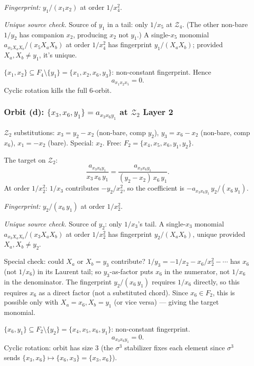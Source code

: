 \documentclass[11pt]{article}
\newcommand{\Z}{\mathcal{Z}}
\theoremstyle{definition}
\begin{document}
\emph{Fingerprint:} $y_1/(x_1 x_2)$ at order $1/x_4^2$.

\emph{Unique source check.} Source of $y_1$ in a tail: only $1/x_5$ at
$\Z_4$. (The other non-bare $1/y_2$ has companion $x_2$, producing $x_2$ not
$y_1$.) A single-$x_5$ monomial $a_{x_5 X_a X_b}/(x_5 X_a X_b)$ at order
$1/x_4^2$ has fingerprint $y_1/(X_a X_b)$; provided $X_a, X_b\ne y_1$, it's
unique.

$\{x_1, x_2\}\subseteq F_4\setminus\{y_1\}=\{x_1, x_2, x_6, y_3\}$: non-constant
fingerprint. Hence
\[
\boxed{a_{x_1 x_2 x_5} = 0.}
\]
Cyclic rotation kills the full 6-orbit.

\subsubsection*{Orbit (d): $\{x_3, x_6, y_1\} = a_{x_3 x_6 y_1}$ at $\Z_2$ Layer 2}

$\Z_2$ substitutions: $x_3 = y_2 - x_2$ (non-bare, comp $y_2$),
$y_3 = x_6 - x_2$ (non-bare, comp $x_6$), $x_1 = -x_2$ (bare).
Special: $x_2$. Free: $F_2 = \{x_4, x_5, x_6, y_1, y_2\}$.

The target on $\Z_2$:
\[
\frac{a_{x_3 x_6 y_1}}{x_3\,x_6\,y_1} = \frac{a_{x_3 x_6 y_1}}{(y_2-x_2)\,x_6\,y_1}.
\]
At order $1/x_2^2$: $1/x_3$ contributes $-y_2/x_2^2$, so the coefficient is
$-a_{x_3 x_6 y_1}\,y_2/(x_6\,y_1)$.

\emph{Fingerprint:} $y_2/(x_6\,y_1)$ at order $1/x_2^2$.

\emph{Unique source check.} Source of $y_2$: only $1/x_3$'s tail. A
single-$x_3$ monomial $a_{x_3 X_a X_b}/(x_3 X_a X_b)$ at order $1/x_2^2$ has
fingerprint $y_2/(X_a X_b)$, unique provided $X_a, X_b\ne y_2$.

Special check: could $X_a$ or $X_b = y_3$ contribute? $1/y_3 = -1/x_2 -
x_6/x_2^2 - \cdots$ has $x_6$ (not $1/x_6$) in its Laurent tail; so
$y_3$-as-factor puts $x_6$ in the numerator, not $1/x_6$ in the denominator.
The fingerprint $y_2/(x_6\,y_1)$ requires $1/x_6$ directly, so this requires
$x_6$ as a direct factor (not a substituted chord). Since $x_6\in F_2$, this
is possible only with $X_a = x_6, X_b = y_1$ (or vice versa) — giving the
target monomial.

$\{x_6, y_1\}\subseteq F_2\setminus\{y_2\}=\{x_4,x_5,x_6,y_1\}$:
non-constant fingerprint.
\[
\boxed{a_{x_3 x_6 y_1} = 0.}
\]
Cyclic rotation: orbit has size 3 (the $\sigma^3$ stabilizer fixes each
element since $\sigma^3$ sends $\{x_3, x_6\}\mapsto\{x_6, x_3\}=\{x_3,x_6\}$).
\end{document}
